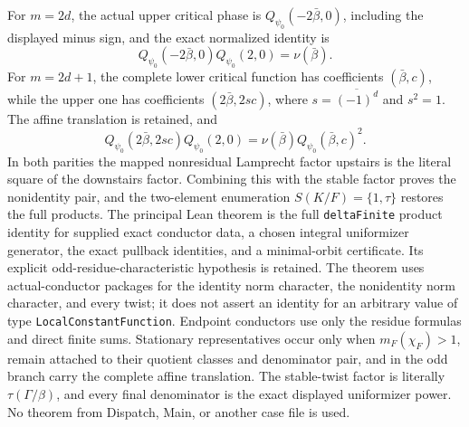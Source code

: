 \begin{theorem}
For $m=2d$, the actual upper critical phase is
$Q_{\psi_0}(-2\bar\beta,0)$, including the displayed minus sign, and the
exact normalized identity is
\[
 Q_{\psi_0}(-2\bar\beta,0)Q_{\psi_0}(2,0)
 =\nu(\bar\beta).
\]
For $m=2d+1$, the complete lower critical function has coefficients
$(\bar\beta,c)$, while the upper one has coefficients
$(2\bar\beta,2sc)$, where
$s=\overline{(-1)^d}$ and $s^2=1$.  The affine translation is retained, and
\[
 Q_{\psi_0}(2\bar\beta,2sc)Q_{\psi_0}(2,0)
 =\nu(\bar\beta)Q_{\psi_0}(\bar\beta,c)^2.
\]
In both parities the mapped nonresidual Lamprecht factor upstairs is the
literal square of the downstairs factor.  Combining this with the stable
factor proves the nonidentity pair, and the two-element enumeration
$S(K/F)=\{1,\tau\}$ restores the full products.
\leanok
{}
\FormalizationContract The principal Lean theorem is the full
\texttt{deltaFinite} product identity for supplied exact conductor data, a
chosen integral uniformizer generator, the exact pullback identities, and a
minimal-orbit certificate.  Its explicit odd-residue-characteristic
hypothesis is retained.  The theorem uses actual-conductor packages for the
identity norm character, the nonidentity norm character, and every twist;
it does not assert an identity for an arbitrary value of type
\texttt{LocalConstantFunction}.  Endpoint conductors use only the residue
formulas and direct finite sums.
Stationary representatives occur only when $m_F(\chi_F)>1$, remain attached
to their quotient classes and denominator pair, and in the odd branch carry
the complete affine translation.  The stable-twist factor is literally
$\tau(\Gamma/\beta)$, and every final denominator is the exact displayed
uniformizer power.  No theorem from Dispatch, Main, or another case file is
used.
\end{theorem}
